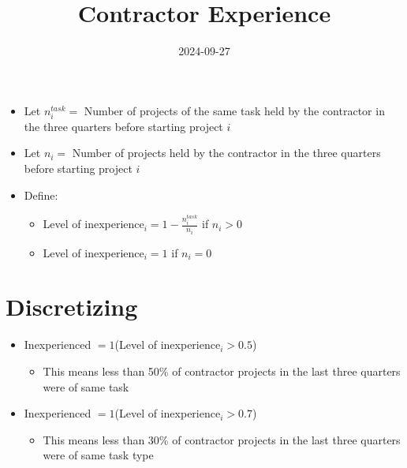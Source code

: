 \documentclass[
]{article}
\title{Contractor Experience}
\author{}
\date{\vspace{-2.5em}2024-09-27}
\providecommand{\tightlist}{%
  \setlength{\itemsep}{0pt}\setlength{\parskip}{0pt}}
\begin{document}
\maketitle

\begin{itemize}
\item
  Let \(n^{task}_{i}=\) Number of projects of the same task held by the
  contractor in the three quarters before starting project \(i\)
\item
  Let \(n_{i}=\) Number of projects held by the contractor in the three
  quarters before starting project \(i\)
\item
  Define:

  \begin{itemize}
  \tightlist
  \item
    Level of inexperience\(_{i}= 1 - \frac{n^{task}_{i}}{n_{i}}\) if
    \(n_{i}>0\)
  \item
    Level of inexperience\(_{i}= 1\) if \(n_{i}=0\)
  \end{itemize}
\end{itemize}

\hypertarget{discretizing}{%
\section{Discretizing}\label{discretizing}}

\begin{itemize}
\tightlist
\item
  Inexperienced \(= 1\)(Level of inexperience\(_{i}>0.5\))

  \begin{itemize}
  \tightlist
  \item
    This means less than 50\% of contractor projects in the last three
    quarters were of same task
  \end{itemize}
\item
  Inexperienced \(= 1\)(Level of inexperience\(_{i}>0.7\))

  \begin{itemize}
  \tightlist
  \item
    This means less than 30\% of contractor projects in the last three
    quarters were of same task type
  \end{itemize}
\end{itemize}
\end{document}
